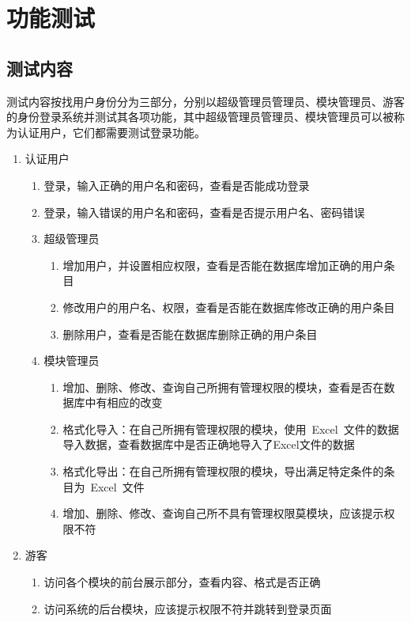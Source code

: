 \section{功能测试}
\subsection{测试内容}
测试内容按找用户身份分为三部分，分别以超级管理员管理员、模块管理员、游客的身份登录系统并测试其各项功能，其中超级管理员管理员、模块管理员可以被称为认证用户，它们都需要测试登录功能。

\begin{enumerate}
\item 认证用户
	\begin{enumerate}
	\item 登录，输入正确的用户名和密码，查看是否能成功登录
	\item 登录，输入错误的用户名和密码，查看是否提示用户名、密码错误
	\item 超级管理员
		\begin{enumerate}
		\item 增加用户，并设置相应权限，查看是否能在数据库增加正确的用户条目
		\item 修改用户的用户名、权限，查看是否能在数据库修改正确的用户条目
		\item 删除用户，查看是否能在数据库删除正确的用户条目
		\end{enumerate}
	\item 模块管理员
		\begin{enumerate}
		\item 增加、删除、修改、查询自己所拥有管理权限的模块，查看是否在数据库中有相应的改变
		\item 格式化导入：在自己所拥有管理权限的模块，使用~Excel~文件的数据导入数据，查看数据库中是否正确地导入了Excel文件的数据
		\item 格式化导出：在自己所拥有管理权限的模块，导出满足特定条件的条目为~Excel~文件
		\item 增加、删除、修改、查询自己所不具有管理权限莫模块，应该提示权限不符
		\end{enumerate}
	\end{enumerate}
\item 游客
	\begin{enumerate}
	\item 访问各个模块的前台展示部分，查看内容、格式是否正确
	\item 访问系统的后台模块，应该提示权限不符并跳转到登录页面
	\end{enumerate}
\end{enumerate}

